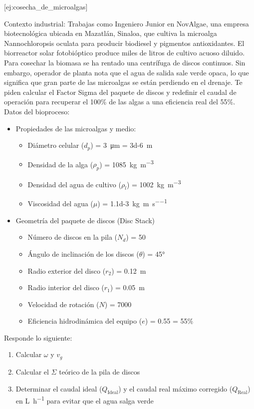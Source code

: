 \documentclass{AsignaturaResumen}
\begin{document}
[ej:cosecha_de_microalgas]{
    Contexto industrial: Trabajas como Ingeniero Junior en NovAlgae, una empresa biotecnológica ubicada en Mazatlán, Sinaloa, que cultiva la microalga Nannochloropsis oculata para producir biodiesel y pigmentos antioxidantes. El biorreactor solar fotobióptico produce miles de litros de cultivo acuoso diluido. \\
    Para cosechar la biomasa se ha rentado una centrífuga de discos continuos. Sin embargo, operador de planta nota que el agua de salida sale verde opaca, lo que significa que gran parte de las microalgas se están perdiendo en el drenaje. Te piden calcular el Factor Sigma del paquete de discos y redefinir el caudal de operación para recuperar el 100\% de las algas a una eficiencia real del 55\%. \\
    Datos del bioproceso:
    \begin{itemize}
    \item Propiedades de las microalgas y medio:
	    \begin{itemize}
	        \item Diámetro celular ($d_{p}$) = \qty{3}{\micro\m} = \qty{3d-6}{\m}
            \item Densidad de la alga ($\rho_{p}$) = \qty{1085}{\kg\per\m\cubed}
            \item Densidad del agua de cultivo ($\rho_{l}$) = \qty{1002}{\kg\per\m\cubed}
            \item Viscosidad del agua ($\mu$) = \qty{1.1d-3}{\kg\per\m\per\s}
	    \end{itemize}
    \item Geometría del paquete de discos (Disc Stack)
	    \begin{itemize}
	        \item Número de discos en la pila ($N_{d}$) = 50
	        \item Ángulo de inclinación de los discos ($\theta$) = 45°
	        \item Radio exterior del disco ($r_{2}$) = \qty{0.12}{\m}
	        \item Radio interior del disco ($r_{1}$) = \qty{0.05}{\m}
	        \item Velocidad de rotación ($N$) = \qty{7000}{\rpm}
	        \item Eficiencia hidrodinámica del equipo ($e$) = 0.55 = 55\%
	    \end{itemize}
	\end{itemize}
	Responde lo siguiente:
	\begin{enumerate}
        \item Calcular $\omega$ y $v_{g}$
        \item Calcular el $\Sigma$ teórico de la pila de discos
        \item Determinar el caudal ideal ($Q_{\text{Ideal}}$) y el caudal real máximo corregido ($Q_{\text{Real}}$) en \unit{\L\per\hour} para evitar que el agua salga verde
    \end{enumerate}
}
\end{document}
